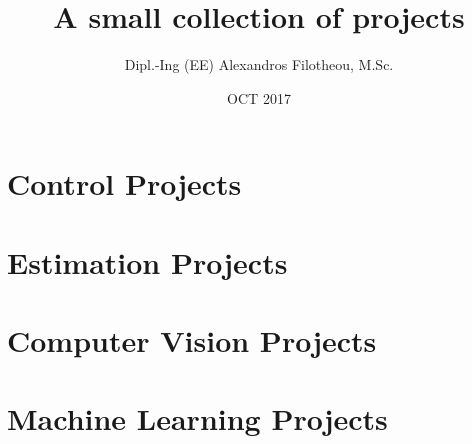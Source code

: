 \documentclass[11pt]{article}
\begin{document}
  \title{A small collection of projects}
  \author{Dipl.-Ing (EE) Alexandros Filotheou, M.Sc.}
  \date{OCT 2017}
  \maketitle
  \vspace{5cm}

  \tableofcontents
  \thispagestyle{empty}
  \clearpage

  \section{Control Projects}
    
    
    
    \newpage

  \section{Estimation Projects}
    
    \newpage

  \section{Computer Vision Projects}
    
    \newpage

  \section{Machine Learning Projects}
    
\end{document}
